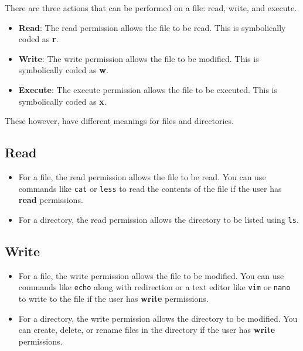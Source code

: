 There are three actions that can be performed on a file: read, write, and execute.

\begin{itemize}
  \item \textbf{Read}: The read permission allows the file to be read.
    This is symbolically coded as \textbf{r}.
  \item \textbf{Write}: The write permission allows the file to be modified.
    This is symbolically coded as \textbf{w}.
  \item \textbf{Execute}: The execute permission allows the file to be executed.
    This is symbolically coded as \textbf{x}.
\end{itemize}

These however, have different meanings for files and directories.

\subsection{Read}

\begin{itemize}
  \item For a file, the read permission allows the file to be read.
    You can use commands like \texttt{cat} or \texttt{less} to read the contents of the file if the user has \textbf{read} permissions.
  \item For a directory, the read permission allows the directory to be listed using \texttt{ls}.
\end{itemize}

\subsection{Write}

\begin{itemize}
  \item For a file, the write permission allows the file to be modified.
    You can use commands like \texttt{echo} along with redirection
    or a text editor like \texttt{vim} or \texttt{nano}
      to write to the file if the user has \textbf{write} permissions.
  \item For a directory, the write permission allows the directory to be modified.
    You can create, delete, or rename files in the directory if the user has \textbf{write} permissions.
\end{itemize}

